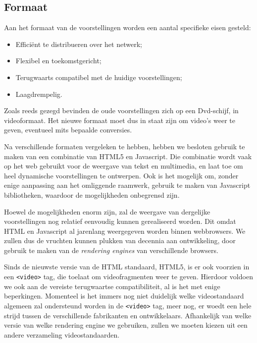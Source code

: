 \subsection{Formaat}

Aan het formaat van de voorstellingen worden een aantal specifieke eisen gesteld:
\begin{itemize}
\item Efficiënt te distribueren over het netwerk;
\item Flexibel en toekomstgericht;
\item Terugwaarts compatibel met de huidige voorstellingen;
\item Laagdrempelig.
\end{itemize}

Zoals reeds gezegd bevinden de oude voorstellingen zich op een Dvd-schijf, in videoformaat. Het nieuwe formaat moet dus in staat zijn om video's weer te geven, eventueel mits bepaalde conversies.

Na verschillende formaten vergeleken te hebben, hebben we besloten gebruik te maken van een combinatie van HTML5 en Javascript. Die combinatie wordt vaak op het web gebruikt voor de weergave van tekst en multimedia, en laat toe om heel dynamische voorstellingen te ontwerpen. Ook is het mogelijk om, zonder enige aanpassing aan het omliggende raamwerk, gebruik te maken van Javascript bibliotheken, waardoor de mogelijkheden onbegrensd zijn.

Hoewel de mogelijkheden enorm zijn, zal de weergave van dergelijke voorstellingen nog relatief eenvoudig kunnen gerealiseerd worden. Dit omdat HTML en Javascript al jarenlang weergegeven worden binnen webbrowsers. We zullen dus de vruchten kunnen plukken van decennia aan ontwikkeling, door gebruik te maken van de \emph{rendering engines} van verschillende browsers.

Sinds de nieuwste versie van de HTML standaard, HTML5, is er ook voorzien in een \texttt{<video>} tag, die toelaat om videofragmenten weer te geven. Hierdoor voldoen we ook aan de vereiste terugwaartse compatibiliteit, al is het met enige beperkingen. Momenteel is het immers nog niet duidelijk welke videostandaard algemeen zal ondersteund worden in de \texttt{<video>} tag, meer nog, er woedt een hele strijd tussen de verschillende fabrikanten en ontwikkelaars. Afhankelijk van welke versie van welke rendering engine we gebruiken, zullen we moeten kiezen uit een andere verzameling videostandaarden.

